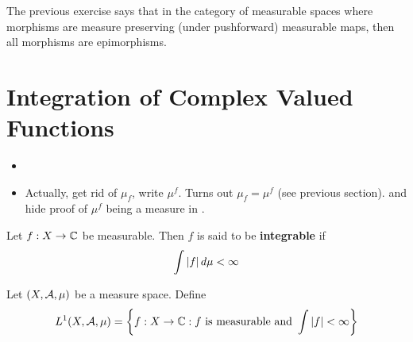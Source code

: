 \documentclass{book}
\begin{document}
	\begin{note}
		The previous exercise says that in the category of measurable spaces where morphisms are measure preserving (under pushforward) measurable maps, then all morphisms are epimorphisms. 
	\end{note}

	
	
	
	
	
	
	
	
	
	
	
	
	
	
	
	
	\newpage
	\section{Integration of Complex Valued Functions}
	
	\begin{itemize}
		\item {}
	\item Actually, get rid of $\mu_f$, write $\mu^f$. Turns out $\mu_f = \mu^f$ (see previous section). and hide proof of $\mu^f$ being a measure in .
	\end{itemize}
	
	\begin{defn}  
		Let $f:X \rightarrow \mathbb{C}$ be measurable. Then $f$ is said to be \textbf{integrable} if $$\int |f| \, d \mu < \infty$$
	\end{defn}
	
		
	
	\begin{defn}  
		Let $(X, \mathcal{A}, \mu)$ be a measure space. Define $$L^1(X, \mathcal{A}, \mu) = \bigg \{f:X \rightarrow \mathbb{C} : f \text{ is measurable and } \int |f| < \infty \bigg \}$$
	\end{defn}
	
\end{document}
